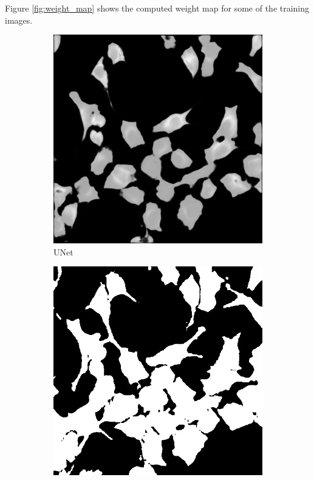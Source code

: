 \documentclass[journal]{IEEEtran}
\begin{document}
Figure \ref{fig:weight_map} shows the computed weight map for some of the training images.

\begin{figure}
\centering
\begin{subfigure}[b]{0.45\linewidth}
\includegraphics[width=\linewidth]{weighted/110115-unet.jpg}
\caption{UNet}
\end{subfigure}
\begin{subfigure}[b]{0.45\linewidth}
\includegraphics[width=\linewidth]{weighted/110115-deeplab.jpg}

\end{subfigure}
\end{figure}
\end{document}
